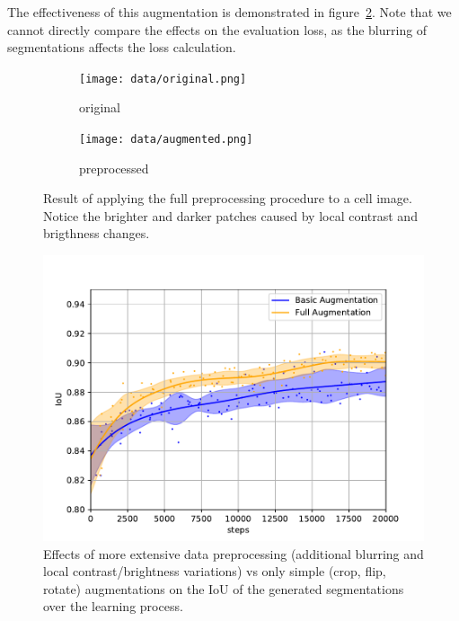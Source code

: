 \documentclass[aps,prl,twocolumn,groupedaddress,amsmath,amssymb]{revtex4-1}
\begin{document}
    The effectiveness of this augmentation is demonstrated in figure~\ref{fig:augment}. Note that we
    cannot directly compare the effects on the evaluation loss, as the blurring of segmentations
    affects the loss calculation.

    \begin{figure}[tbp]
        \begin{subfigure}[c]{0.45\linewidth}
            \texttt{[image: data/original.png]}
            \caption{original}
        \end{subfigure}
        \begin{subfigure}[c]{0.45\linewidth}
            \texttt{[image: data/augmented.png]}
            \caption{preprocessed}
        \end{subfigure}
        \caption{Result of applying the full preprocessing procedure to a cell image. 
        Notice the brighter and darker patches caused by local contrast and brigthness changes.}
        \label{fig:augmentimage}
    \end{figure}

    \begin{figure}[tbp]
        \begin{center}
        \includegraphics[width=\linewidth]{figures/augment.pdf}
        \end{center}
        \caption{Effects of more extensive data preprocessing (additional blurring and local 
        contrast/brightness variations) vs only simple (crop, flip, rotate) augmentations on the 
        IoU of the generated segmentations over the learning process.}
        \label{fig:augment}
    \end{figure}
\end{document}
